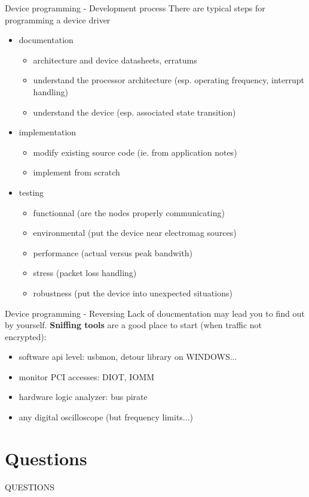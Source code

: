 \begin{frame}{Device programming - Development process}
  There are typical steps for programming a device driver
  \begin{itemize}
  \item documentation
    \begin{itemize}
    \item architecture and device datasheets, erratums
    \item understand the processor architecture (esp. operating frequency, interrupt handling)
    \item understand the device (esp. associated state transition)
    \end{itemize}
  \item implementation
    \begin{itemize}
    \item modify existing source code (ie. from application notes)
    \item implement from scratch
    \end{itemize}
  \item testing
    \begin{itemize}
    \item functionnal (are the nodes properly communicating)
    \item environmental (put the device near electromag sources)
    \item performance (actual versus peak bandwith)
    \item stress (packet loss handling)
    \item robustness (put the device into unexpected situations)
    \end{itemize}
  \end{itemize}
\end{frame}

\begin{frame}{Device programming - Reversing}
  Lack of doucmentation may lead you to find out by yourself. \textbf{Sniffing tools} are a good
  place to start (when traffic not encrypted):
  \begin{itemize}
  \item software api level: usbmon, detour library on WINDOWS...
  \item monitor PCI accesses: DIOT, IOMM
  \item hardware logic analyzer: bus pirate
  \item any digital oscilloscope (but frequency limits...)
  \end{itemize}
\end{frame}

%
%

\section{Questions}
\begin{frame}
  \begin{center}
    QUESTIONS
  \end{center}
\end{frame}


